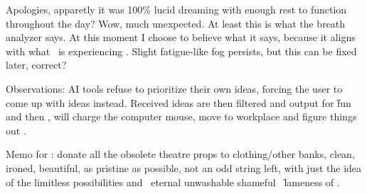 Apologies, apparetly it was 100\% lucid dreaming with enough rest to function throughout the day? Wow, much unexpected. At least this is what the breath analyzer says. At this moment I choose to believe what it says, because it aligns with what \set\ is experiencing . Slight fatigue-like fog persists, but this can be fixed later, correct?

Observations: AI tools refuse to prioritize their own ideas, forcing the user to come up with ideas instead. Received ideas are then filtered  and output  for \f{fun} and then  , will charge the computer mouse, move to workplace and figure things out .

Memo for \sewei: donate all the obsolete theatre props to clothing/other banks, clean, ironed, beautiful, as pristine as possible, not an odd string left, with just the idea of the  limitless possibilities and \hatr\ eternal unwashable shameful \hatw\ \f{lameness}  of \sewei.
